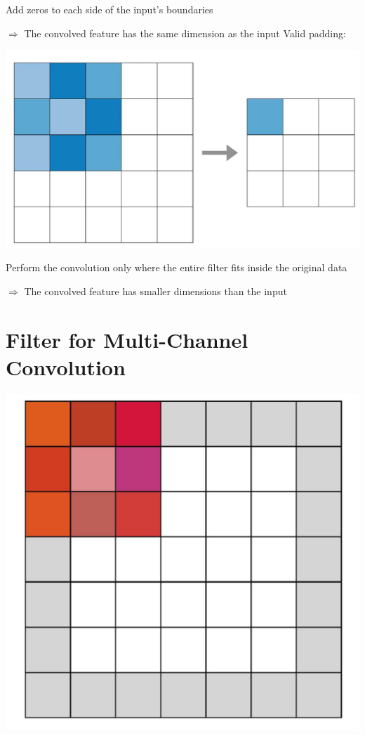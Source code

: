 \documentclass[10pt]{article}
\begin{document}
Add zeros to each side of the input's boundaries

$\Rightarrow$ The convolved feature has the same dimension as the input
Valid padding:

\begin{center}
\includegraphics[max width=\textwidth]{2024_01_08_959e2db67a31f073f6d2g-06}
\end{center}

Perform the convolution only where the entire filter fits inside the original data

$\Rightarrow$ The convolved feature has smaller dimensions than the input

\section*{Filter for Multi-Channel Convolution}
\begin{center}
\includegraphics[max width=\textwidth]{2024_01_08_959e2db67a31f073f6d2g-07(1)}
\end{center}
\end{document}
